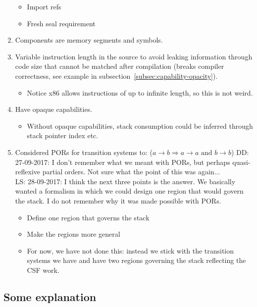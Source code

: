 \documentclass[a3paper]{article}
\newcommand\lau[1]{{\color{purple} \sf \footnotesize {LS: #1}}\\}
\newcommand\dominique[1]{{\color{purple} \sf \footnotesize {DD: #1}}\\}
\begin{document}
\begin{enumerate}
\begin{itemize}
  \item Import refs
  \item Fresh seal requirement
  \end{itemize}
\item Components are memory segments and symbols.
\item Variable instruction length in the source to avoid leaking information through code size that cannot be matched after compilation (breaks compiler correctness, see example in subsection~\ref{subsec:capability-opacity}).
  \begin{itemize}
  \item Notice x86 allows instructions of up to infinite length, so this is not weird.
  \end{itemize}
\item Have opaque capabilities.
  \begin{itemize}
  \item Without opaque capabilities, stack consumption could be inferred through stack pointer index etc.
  \end{itemize}
\item Considered PORs for transition systems to: ($a \rightarrow b \Rightarrow a \rightarrow a \text{ and } b \rightarrow b$)
  \dominique{27-09-2017: I don't remember what we meant with PORs, but perhaps quasi-reflexive partial orders.  Not sure what the point of this was again... }
  \lau{28-09-2017: I think the next three points is the answer. We basically wanted a formalism in which we could design one region that would govern the stack. I do not remember why it was made possible with PORs.}
  \begin{itemize}
  \item Define one region that governs the stack
  \item Make the regions more general
  \item For now, we have not done this: instead we stick with the transition systems we have and have two regions governing the stack reflecting the CSF work.
  \end{itemize}
\end{enumerate}

\subsection{Some explanation}
\end{document}
